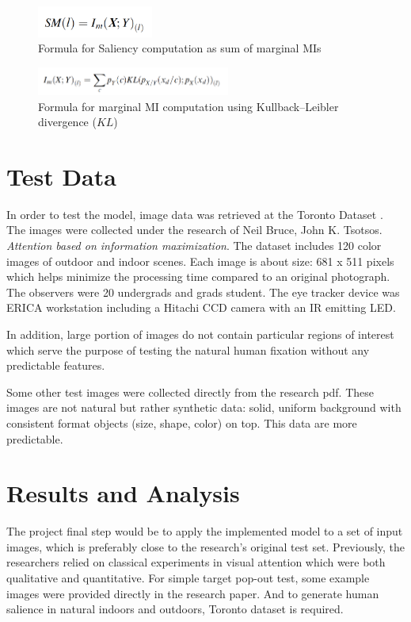 \documentclass[conference]{IEEEtran}
\begin{document}
\begin{figure}[h]
    \centering
    \includegraphics[width=1.5in]{alternative.png}
    \caption{Formula for Saliency computation as sum of marginal MIs}
    \label{fig:sum_formula}
\end{figure}
 
\begin{figure}[h]
    \centering
    \includegraphics[width=2.5in]{KL.png}
    \caption{Formula for marginal MI computation using Kullback–Leibler divergence ($KL$) }
    \label{fig:kl_formula}
\end{figure}

\section{Test Data}
In order to test the model, image data was retrieved at the Toronto Dataset \cite{MITBenchmark_2012}. The images were collected under the research of Neil Bruce, John K. Tsotsos. \textit{Attention based on information maximization}. The dataset includes 120 color images of outdoor and indoor scenes. Each image is about size: 681 x 511 pixels which helps minimize the processing time compared to an original photograph. The observers were 20 undergrads and grads student. The eye tracker device was ERICA workstation including a Hitachi CCD camera with an IR emitting LED.

In addition, large portion of images do not contain particular regions of interest which serve the purpose of testing the natural human fixation without any predictable features. 

Some other test images were collected directly from the research pdf. These images are not natural but rather synthetic data: solid, uniform background with consistent format objects (size, shape, color) on top. This data are more predictable.

\section{Results and Analysis}
The project final step would be to apply the implemented model to a set of input images, which is preferably close to the research’s original test set. Previously, the researchers relied on classical experiments in visual attention which were both qualitative and quantitative. For simple target pop-out test, some example images were provided directly in the research paper. And to generate human salience in natural indoors and outdoors, Toronto dataset is required.
\end{document}
